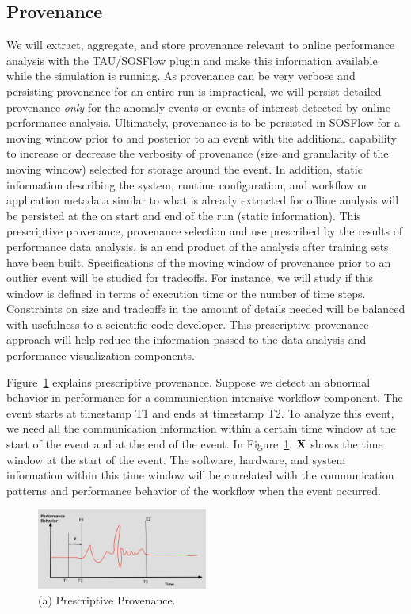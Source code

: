\subsection{Provenance}
\label{subsection:features}
We will extract, aggregate, and store provenance relevant to online performance analysis with the TAU/SOSFlow plugin and make this information available while the simulation is running.  As provenance can be very verbose and persisting provenance for an entire run is impractical, we will persist detailed provenance {\em only} for the anomaly events or events of interest detected by online performance analysis.  Ultimately, provenance is to be persisted in SOSFlow for a moving window prior to and posterior to an event with the additional capability to increase or decrease the verbosity of provenance (size and granularity of the moving window) selected for storage around the event.  In addition, static information describing the system, runtime configuration, and  workflow or application metadata similar to what is already extracted for offline analysis will be persisted at the on start and end of the run (static information).  This prescriptive provenance,  provenance selection and use prescribed by the results of performance data analysis, is an end product of the analysis after training sets have been built.
Specifications of the moving window of provenance prior to an outlier event will be studied for tradeoffs.  For instance, we will study if this window is defined in terms of execution time or the number of time steps.  Constraints on size and tradeoffs in the amount of details needed will be balanced with usefulness to a scientific code developer.
This prescriptive provenance approach will help reduce the information passed to the data analysis and performance visualization components.

Figure~\ref{designfig:2} explains prescriptive provenance. Suppose we detect an abnormal behavior in performance for a communication intensive workflow component. The event starts at timestamp T1 and ends at timestamp T2. To analyze this event, we need all the communication information within a certain time window at the start of the event and at the end of the event. In Figure~\ref{designfig:2}, ${\bf{X}}$ shows the time window at the start of the event. The software, hardware, and system information within this time window will be correlated with the communication patterns and performance behavior of the workflow when the event occurred.

\begin{figure}[th!]
 \centering
  \includegraphics[width=0.5\textwidth]{Figs/Provenance}
 \caption{(a) Prescriptive Provenance.}
\label{designfig:2}     
 \end{figure}

